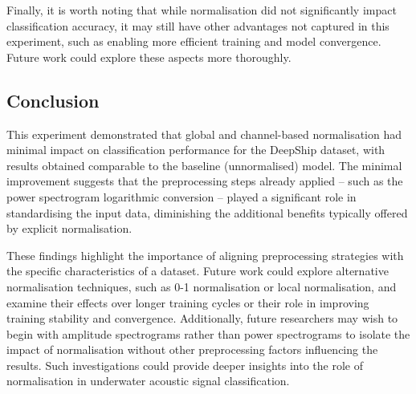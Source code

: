 Finally, it is worth noting that while normalisation did not significantly impact classification accuracy, it may still have other advantages not captured in this experiment, such as enabling more efficient training and model convergence. Future work could explore these aspects more thoroughly.

\subsection{Conclusion}

This experiment demonstrated that global and channel-based normalisation had minimal impact on classification performance for the DeepShip dataset, with results obtained comparable to the baseline (unnormalised) model. The minimal improvement suggests that the preprocessing steps already applied -- such as the power spectrogram logarithmic conversion -- played a significant role in standardising the input data, diminishing the additional benefits typically offered by explicit normalisation.

These findings highlight the importance of aligning preprocessing strategies with the specific characteristics of a dataset. Future work could explore alternative normalisation techniques, such as 0-1 normalisation or local normalisation, and examine their effects over longer training cycles or their role in improving training stability and convergence. Additionally, future researchers may wish to begin with amplitude spectrograms rather than power spectrograms to isolate the impact of normalisation without other preprocessing factors influencing the results. Such investigations could provide deeper insights into the role of normalisation in underwater acoustic signal classification.